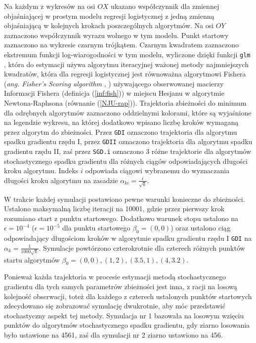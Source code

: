 Na każdym z wykresów na osi $OX$ ukazano współczynnik dla zmiennej objaśniającej w prostym modelu regresji logistycznej z jedną zmienną objaśniającą w kolejnych krokach poszczególnych algorytmów. Na osi $OY$ zaznaczono współczynnik wyrazu wolnego w tym modelu. Punkt startowy zaznaczono na wykresie czarnym trójkątem. Czarnym kwadratem zaznaczono ekstremum funkcji log-wiarogodności w tym modelu, wyliczone dzięki funkcji \texttt{glm} \cite{glmglm}, która do estymacji używa algorytmu iteracyjnej ważonej metody najmniejszych kwadratów, która dla regresji logistycznej jest równoważna algorytmowi Fishera (\textit{ang. Fisher's Scoring algorithm} \cite{scoring1}, \cite{scoring2}) używającego obserwowanej macierzy Informacji Fishera (definicja (\ref{inf:fish})) w miejscu Hesjanu w algorytmie Newtona-Raphsona (równanie (\ref{NJU-rap})). Trajektoria zbieżności do minimum dla odrębnych algorytmów zaznaczono oddzielnymi kolorami, które są wyjaśnione na legendzie wykresu, na której dodatkowo wpisano liczbę kroków wymaganą przez algorytm do zbieżności. Przez \texttt{GDI} oznaczono trajektoria dla algorytmu spadku gradientu rzędu I, przez \texttt{GDII} oznaczono trajektoria dla algorytmu spadku gradientu rzędu II, zaś przez \texttt{SGD.i} oznaczono 3 różne trajektorie dla algorytmów stochastycznego spadku gradientu dla różnych ciągów odpowiadających długości kroku algorytmu. Indeks $i$ odpowiada ciągowi wybranemu do wyznaczania długości kroku algorytmu na zasadzie $\alpha_{ki} = \frac{i}{\sqrt{k}}$.

W trakcie każdej symulacji postawiono pewne warunki konieczne do zbieżności. Ustalono maksymalną liczbę iteracji na 10001, gdzie przez pierwszy krok rozumiano start z punktu startowego. Dodatkowo warunek stopu ustalono na $\epsilon=10^{-4}$ ($\epsilon=10^{-5}$ dla punktu startowego $\beta_0 = (0,0)$) oraz ustalono ciąg odpowiadający długościom kroków w algorytmie spadku gradientu rzędu I \texttt{GDI} na $\alpha_{k} = \frac{1}{1000\sqrt{k}}$. Symulacje powtórzono czterokrotnie dla czterech różnych punktów startu algorytmów $\beta_0 = (0,0), (1,2), (3.5,1), (4,3.2).$

Ponieważ każda trajektoria w procesie estymacji metodą stochastycznego gradientu dla tych samych parametrów zbieżności jest inna, z racji na losową kolejność obserwacji, toteż dla każdego z czterech ustalonych punktów startowych zdecydowano się zobrazować symulację dwukrotnie, aby móc przedstawić stochastyczny aspekt tej metody. Symulacja nr 1 bazowała na losowym wzięciu punktów do algorytmów stochastycznego spadku gradientu, gdy ziarno losowania było ustawione na 4561, zaś dla symulacji nr 2 ziarno ustawiono na 456.

